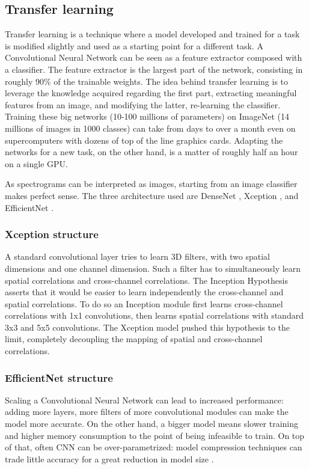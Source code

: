 \subsection{Transfer learning}

Transfer learning is a technique where a model developed and trained for a task
is modified slightly and used as a starting point for a different task.
A Convolutional Neural Network can be seen as a feature extractor composed with
a classifier.
The feature extractor is the largest part of the network, consisting in roughly
90\% of the trainable weights.
The idea behind transfer learning is to leverage the knowledge acquired
regarding the first part, extracting meaningful features from an image, and
modifying the latter, re-learning the classifier.
Training these big networks (10-100 millions of parameters) on ImageNet (14
millions of images in 1000 classes) can take from days to over a month even on
supercomputers with dozens of top of the line graphics cards.
Adapting the networks for a new task, on the other hand, is a matter of roughly
half an hour on a single GPU.

As spectrograms can be interpreted as images, starting from an image classifier
makes perfect sense. The three architecture used are
DenseNet
\cite{huang2018densely},
Xception 
\cite{chollet2017xception},
and
EfficientNet
\cite{tan2020efficientnet}.

\subsubsection{Xception structure}

A standard convolutional layer tries to learn 3D filters, with two spatial
dimensions and one channel dimension.
Such a filter has to simultaneously learn spatial correlations and
cross-channel correlations.
The Inception Hypothesis asserts that it would be easier to learn independently
the cross-channel and spatial correlations.
To do so an Inception module first learns cross-channel correlations with 1x1
convolutions, then learns spatial correlations with standard 3x3 and 5x5
convolutions.
The Xception model pushed this hypothesis to the limit, completely decoupling
the mapping of spatial and cross-channel correlations.

\subsubsection{EfficientNet structure}

Scaling a Convolutional Neural Network can lead to increased performance:
adding more layers, more filters of more convolutional modules can make the
model more accurate. On the other hand, a bigger model means slower training
and higher memory consumption to the point of being infeasible to train.
On top of that, often CNN can be over-parametrized: model compression
techniques can trade little accuracy for a great reduction in model size
\cite{han2016deep}.

